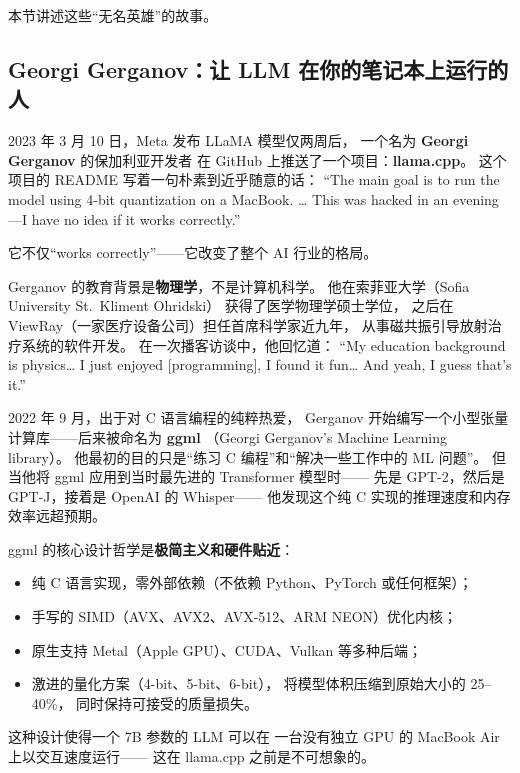 本节讲述这些``无名英雄''的故事。


\subsection{Georgi Gerganov：让 LLM 在你的笔记本上运行的人}
\label{subsec:gerganov}

2023 年 3 月 10 日，Meta 发布 LLaMA 模型仅两周后，
一个名为 \textbf{Georgi Gerganov} 的保加利亚开发者
在 GitHub 上推送了一个项目：\textbf{llama.cpp}。
这个项目的 README 写着一句朴素到近乎随意的话：
``The main goal is to run the model using 4-bit quantization on a MacBook.
\ldots{} This was hacked in an evening---I have no idea if it works correctly.''

它不仅``works correctly''——它改变了整个 AI 行业的格局。

Gerganov 的教育背景是\textbf{物理学}，不是计算机科学。
他在索菲亚大学（Sofia University St.\ Kliment Ohridski）
获得了医学物理学硕士学位，
之后在 ViewRay（一家医疗设备公司）担任首席科学家近九年，
从事磁共振引导放射治疗系统的软件开发。
在一次播客访谈中，他回忆道：
``My education background is physics\ldots{}
I just enjoyed [programming], I found it fun\ldots{}
And yeah, I guess that's it.''

2022 年 9 月，出于对 C 语言编程的纯粹热爱，
Gerganov 开始编写一个小型张量计算库——后来被命名为 \textbf{ggml}
（Georgi Gerganov's Machine Learning library）。
他最初的目的只是``练习 C 编程''和``解决一些工作中的 ML 问题''。
但当他将 ggml 应用到当时最先进的 Transformer 模型时——
先是 GPT-2，然后是 GPT-J，接着是 OpenAI 的 Whisper——
他发现这个纯 C 实现的推理速度和内存效率远超预期。

\begin{keybox}
ggml 的核心设计哲学是\textbf{极简主义和硬件贴近}：
\begin{itemize}[noitemsep]
  \item 纯 C 语言实现，零外部依赖（不依赖 Python、PyTorch 或任何框架）；
  \item 手写的 SIMD（AVX、AVX2、AVX-512、ARM NEON）优化内核；
  \item 原生支持 Metal（Apple GPU）、CUDA、Vulkan 等多种后端；
  \item 激进的量化方案（4-bit、5-bit、6-bit），
    将模型体积压缩到原始大小的 25--40\%，
    同时保持可接受的质量损失。
\end{itemize}
这种设计使得一个 7B 参数的 LLM 可以在
一台没有独立 GPU 的 MacBook Air 上以交互速度运行——
这在 llama.cpp 之前是不可想象的。
\end{keybox}

